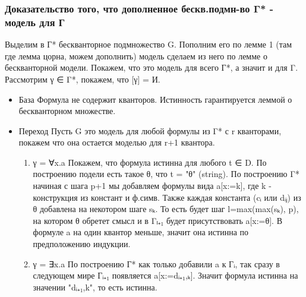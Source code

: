 \documentclass[11pt]{article}
\begin{document}
\subsubsection{Доказательство того, что дополненное бескв.подмн-во Γ* - модель для Г}
\label{sec-8-7-2}
Выделим в Г* бескванторное подмножество G.
Пополним его по лемме 1 (там где лемма цорна, можем дополнить)
модель сделаем из него по лемме о бескванторной модели.
Покажем, что это модель для всего Г*, а значит и для Γ.
Рассмотрим γ ∈ Γ*, покажем, что [γ] = И.
\begin{itemize}
\item База
Формула не содержит кванторов. Истинность гарантируется леммой о
бескванторном множестве.
\item Переход
Пусть G это модель для любой формулы из Γ* с r кванторами,
покажем что она остается моделью для r+1 квантора.
\begin{enumerate}
\item γ = ∀x.a
Покажем, что формула истинна для любого t ∈ D.
По построению подели есть такое θ, что t = "θ" (string).
По построению Γ* начиная с шага p+1 мы добавляем формулы
вида a[x:=k], где k - конструкция из констант и ф.симв.
Также каждая константа (cᵢ или dᵢⱼ) из θ добавлена на
некотором шаге sₖ. То есть будет шаг l=max(max(sₖ), p),
на котором θ обретет смысл и в Γₗ₊₁ будет присутствовать
a[x:=θ]. В формуле a на один квантор меньше, значит она
истинна по предположению индукции.
\item γ = ∃x.a По построению Г* как только добавили a к Гᵢ, так
сразу в следующем мире Гᵢ₊₁ появляется a[x:=dᵢ₊₁,ₖ]. Значит
формула истинна на значении "dᵢ₊₁,k", то есть истинна.
\end{enumerate}
\end{itemize}
\end{document}
